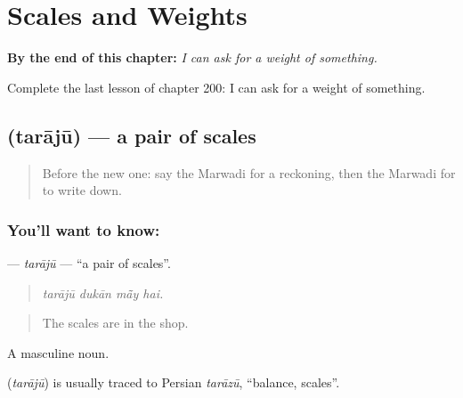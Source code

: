 
\chapter{Scales and Weights}
\label{ch:mw-scales-and-weights}

\begin{chapteropening}
\textbf{By the end of this chapter:} \emph{I can ask for a weight of something.}

Complete the last lesson of chapter 200: I can ask for a weight of something.
\end{chapteropening}

\section[\texorpdfstring{\mw{तराजू} (tarājū)}{तराजू (tarājū)}]{ (tarājū) — a pair of scales}

\label{lesson:MW-C200-taraju}



\begin{quote}
Before the new one: say the Marwadi for a reckoning, then the Marwadi for to write down.
\end{quote}

\subsection*{You'll want to know: }
\textbf{} — \emph{tarājū} — \textquotedblleft{}a pair of scales\textquotedblright{}.

\begin{quote}
   
\end{quote}

\begin{quote}
\emph{tarājū dukān mā̃y hai.}
\end{quote}

\begin{quote}
The scales are in the shop.
\end{quote}

A masculine noun.

\begin{cousinweb}
\textbf{} (\emph{tarājū}) is usually traced to Persian \emph{tarāzū}, \textquotedblleft{}balance, scales\textquotedblright{}.
\end{cousinweb}

